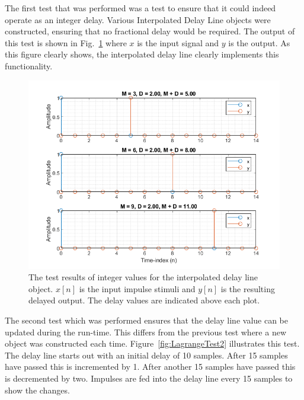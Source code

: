 \documentclass[../main.tex]{subfiles}
\begin{document}
The first test that was performed was a test to ensure that it could indeed operate as an integer delay. Various Interpolated Delay Line objects were constructed, ensuring that no fractional delay would be required. The output of this test is shown in Fig.~\ref{fig:LagrangeTest1} where $x$ is the input signal and $y$ is the output. As this figure clearly shows, the interpolated delay line clearly implements this functionality.

\begin{figure}[h]
    \centering
    \includegraphics[scale=.65]{./images/plots/LagrangeTest1.png}
    \caption{The test results of integer values for the interpolated delay line object. $x[n]$ is the input impulse stimuli and $y[n]$ is the resulting delayed output. The delay values are indicated above each plot.}
    \label{fig:LagrangeTest1}
\end{figure}

The second test which was performed ensures that the delay line value can be updated during the run-time. This differs from the previous test where a new object was constructed each time. Figure~\ref{fig:LagrangeTest2} illustrates this test. The delay line starts out with an initial delay of 10 samples. After 15 samples have passed this is incremented by 1. After another 15 samples have passed this is decremented by two. Impulses are fed into the delay line every 15 samples to show the changes.
\end{document}
